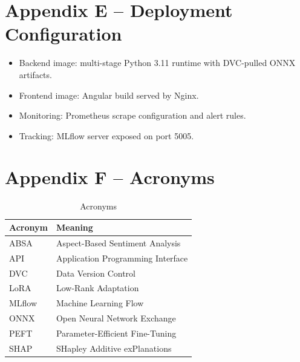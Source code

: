 \documentclass[12pt, a4paper]{article}
\begin{document}
\section{Appendix E -- Deployment Configuration}
\begin{itemize}[noitemsep]
  \item Backend image: multi-stage Python 3.11 runtime with DVC-pulled ONNX artifacts.
  \item Frontend image: Angular build served by Nginx.
  \item Monitoring: Prometheus scrape configuration and alert rules.
  \item Tracking: MLflow server exposed on port 5005.
\end{itemize}

\section{Appendix F -- Acronyms}
\begin{table}[H]
\centering
\caption{Acronyms}
\begin{tabularx}{\textwidth}{@{} p{2.5cm} X @{}}
\toprule
\textbf{Acronym} & \textbf{Meaning} \\
\midrule
ABSA & Aspect-Based Sentiment Analysis \\
API & Application Programming Interface \\
DVC & Data Version Control \\
LoRA & Low-Rank Adaptation \\
MLflow & Machine Learning Flow \\
ONNX & Open Neural Network Exchange \\
PEFT & Parameter-Efficient Fine-Tuning \\
SHAP & SHapley Additive exPlanations \\
\bottomrule
\end{tabularx}
\end{table}
\end{document}
